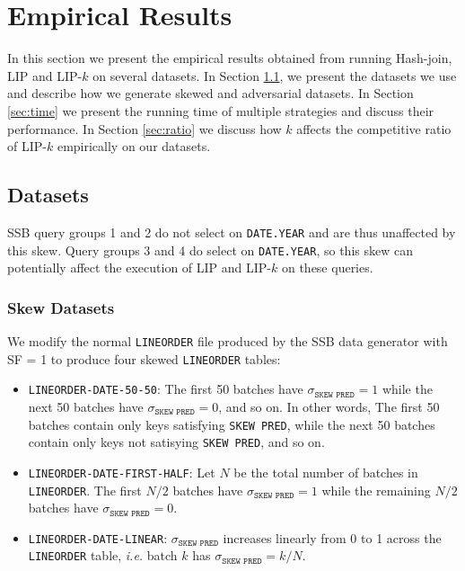 \section{Empirical Results}\label{sec:experiment}

In this section we present the empirical results obtained from running Hash-join, LIP and LIP-$k$ on several datasets. In Section \ref{sec:dataset}, we present the datasets we use and describe how we generate skewed and adversarial datasets. In Section \ref{sec:time} we present the running time of multiple strategies and discuss their performance. In Section \ref{sec:ratio} we discuss how $k$ affects the competitive ratio of LIP-$k$ empirically on our datasets.

\subsection{Datasets}
\label{sec:dataset}



SSB query groups 1 and 2 do not select on \texttt{DATE.YEAR} and are thus unaffected by this skew.
Query groups 3 and 4 do select on \texttt{DATE.YEAR}, so this skew can potentially affect the execution of LIP and LIP-$k$ on these queries.

\subsubsection{Skew Datasets}

We modify the normal \texttt{LINEORDER} file produced by the SSB data generator with SF = 1 to produce four skewed \texttt{LINEORDER} tables: 


\begin{itemize}
    \item \texttt{LINEORDER-DATE-50-50}: The first 50 batches have $\sigma_{\texttt{SKEW PRED}} = 1$ while the next 50 batches have $\sigma_{\texttt{SKEW PRED}} = 0$, and so on.
    In other words, The first 50 batches contain only keys satisfying \texttt{SKEW PRED}, 
    while the next 50 batches contain only keys not satisying \texttt{SKEW PRED}, 
    and so on. 

    \item \texttt{LINEORDER-DATE-FIRST-HALF}: Let $N$ be the total number of batches in \texttt{LINEORDER}. 
    The first $N/2$ batches have $\sigma_{\texttt{SKEW PRED}} = 1$ while the remaining $N/2$ batches have $\sigma_{\texttt{SKEW PRED}} = 0$.

    \item \texttt{LINEORDER-DATE-LINEAR}: $\sigma_{\texttt{SKEW PRED}}$ increases linearly from 0 to 1 across the \texttt{LINEORDER} table, 
    {\it i.e.} batch $k$ has $\sigma_{\texttt{SKEW PRED}} = k/N$.
\end{itemize}

